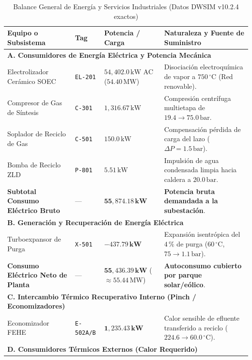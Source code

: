\documentclass[11pt,a4paper]{article}
\begin{document}
\begin{table}[H]
\centering
\small
\caption{Balance General de Energía y Servicios Industriales (Datos DWSIM v10.2.4 exactos)}
\label{tab:balance_energia}
\begin{tabular}{p{5.5cm} p{1.8cm} p{3.2cm} p{4.2cm}}
\toprule
\textbf{Equipo o Subsistema} & \textbf{Tag} & \textbf{Potencia / Carga} & \textbf{Naturaleza y Fuente de Suministro} \\
\midrule
\multicolumn{4}{l}{\textbf{A. Consumidores de Energía Eléctrica y Potencia Mecánica}} \\
\midrule
Electrolizador Cerámico SOEC & \texttt{EL-201} & $54{,}402.0\,\text{kW}$ AC ($54.40\,\text{MW}$) & Disociación electroquímica de vapor a $750\,^\circ\text{C}$ (Red renovable). \\
Compresor de Gas de Síntesis & \texttt{C-301} & $1{,}316.67\,\text{kW}$ & Compresión centrífuga multietapa de $19.4 \to 75.0\,\text{bar}$. \\
Soplador de Reciclo de Gas & \texttt{C-501} & $150.0\,\text{kW}$ & Compensación pérdida de carga del lazo ($\Delta P = 1.5\,\text{bar}$). \\
Bomba de Reciclo ZLD & \texttt{P-801} & $5.51\,\text{kW}$ & Impulsión de agua condensada limpia hacia caldera a $20.0\,\text{bar}$. \\
\midrule
\textbf{Subtotal Consumo Eléctrico Bruto} & --- & $\mathbf{55{,}874.18\,\text{kW}}$ & \textbf{Potencia bruta demandada a la subestación}. \\
\midrule
\multicolumn{4}{l}{\textbf{B. Generación y Recuperación de Energía Eléctrica}} \\
\midrule
Turboexpansor de Purga & \texttt{X-501} & $\mathbf{-437.79\,\text{kW}}$ & Expansión isentrópica del $4\,\%$ de purga ($60\,^\circ\text{C}$, $75 \to 1.1\,\text{bar}$). \\
\midrule
\textbf{Consumo Eléctrico Neto de Planta} & --- & $\mathbf{55{,}436.39\,\text{kW}}$ ($\approx 55.44\,\text{MW}$) & \textbf{Autoconsumo cubierto por parque solar/eólico}. \\
\midrule
\multicolumn{4}{l}{\textbf{C. Intercambio Térmico Recuperativo Interno (Pinch / Economizadores)}} \\
\midrule
Economizador FEHE & \texttt{E-502A/B} & $\mathbf{1{,}235.43\,\text{kW}}$ & Calor sensible de efluente transferido a reciclo ($224.6 \to 60.0\,^\circ\text{C}$). \\
\midrule
\multicolumn{4}{l}{\textbf{D. Consumidores Térmicos Externos (Calor Requerido)}} \\

\end{tabular}
\end{table}
\end{document}
